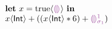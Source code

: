 

\newcommand{\THole}{\ensuremath{\SyEHole{}{}}}
\newcommand{\TInt}{\ensuremath{\SyTInt}}

\newcommand{\ELet}[2]{\ensuremath{\SyLet #1 = #2}}
\newcommand{\ELetAnn}[3]{\ensuremath{\SyLet #1 \SyColon #2 = #3}}
\newcommand{\EInn}{\ensuremath{\SyInn}}
\newcommand{\EIn}[1]{\ensuremath{\SyIn #1}}
\newcommand{\EPlus}[2]{\ensuremath{#1 \SyPlus #2}}
\newcommand{\ETimes}[2]{\ensuremath{#1 \SyTimes #2}}
\newcommand{\ECast}[2]{\ensuremath{#1 \SyCastL #2 \SyCastR}}

\newcommand{\ETrue}{\ensuremath{\SyTrue}}
\newcommand{\EEHole}[1]{\ensuremath{\SyEHole{#1}{\sigma_{#1}}}}


  \[\begin{array}{l}
    \ELet{x}{\ECast{\ETrue}{\THole}} \EInn \\
    \EPlus{\ECast{x}{\TInt}}{(\EPlus{(\ETimes{\ECast{x}{\TInt}}{6})}{\EEHole{1}})}
  \end{array}\]

